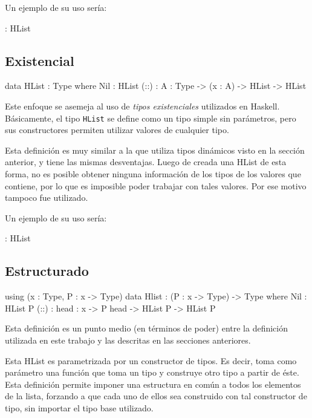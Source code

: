 Un ejemplo de su uso sería:

\begin{code}
 : HList
\end{code}

\subsection{Existencial}

\begin{code}
data HList : Type where
  Nil : HList
  (::) : {A : Type} -> (x : A) -> HList -> HList
\end{code}

Este enfoque se asemeja al uso de \textit{tipos existenciales} utilizados en Haskell. Básicamente, el tipo \texttt{HList} se define como un tipo simple sin parámetros, pero sus constructores permiten utilizar valores de cualquier tipo.

Esta definición es muy similar a la que utiliza tipos dinámicos visto en la sección anterior, y tiene las mismas desventajas. Luego de creada una HList de esta forma, no es posible obtener ninguna información de los tipos de los valores que contiene, por lo que es imposible poder trabajar con tales valores. Por ese motivo tampoco fue utilizado.

Un ejemplo de su uso sería:

\begin{code}
[1, "2"] : HList
\end{code}

\subsection{Estructurado}

\begin{code}
using (x : Type, P : x -> Type)
  data Hlist : (P : x -> Type) -> Type where
    Nil : HList P
    (::) : {head : x} -> P head -> HList P ->
      HList P
\end{code}

Esta definición es un punto medio (en términos de poder) entre la definición utilizada en este trabajo y las descritas en las secciones anteriores.

Esta HList es parametrizada por un constructor de tipos. Es decir, toma como parámetro una función que toma un tipo y construye otro tipo a partir de éste. Esta definición permite imponer una estructura en común a todos los elementos de la lista, forzando a que cada uno de ellos sea construido con tal constructor de tipo, sin importar el tipo base utilizado.

